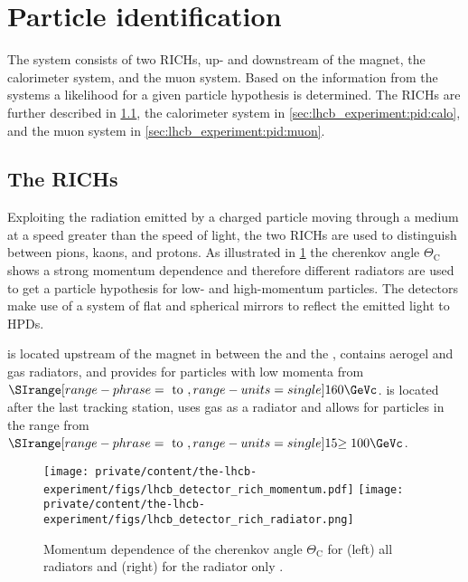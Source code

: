 \section{Particle identification}
\label{sec:lhcb_experiment:pid}

The \LHCb \PID system consists of two \acp{RICH}, up- and downstream of the
magnet, the calorimeter system, and the muon system. Based on the information
from the \PID systems a likelihood for a given particle hypothesis is
determined. The \acp{RICH} are further described in
\cref{sec:lhcb_experiment:pid:rich}, the calorimeter system in
\cref{sec:lhcb_experiment:pid:calo}, and the muon system in
\cref{sec:lhcb_experiment:pid:muon}.

\subsection{The \aclp*{RICH}}
\label{sec:lhcb_experiment:pid:rich}

Exploiting the radiation emitted by a charged particle moving through a medium
at a speed greater than the speed of light, the two \acp{RICH} are used to
distinguish between pions, kaons, and protons. As illustrated in
\cref{fig:lhcb_experiment:tracking:pid:radiator} the cherenkov angle
$\Theta_\mathrm{C}$ shows a strong momentum dependence and therefore different
radiators are used to get a particle hypothesis for low- and high-momentum
particles. The detectors make use of a system of flat and spherical mirrors to
reflect the emitted light to \acp{HPD}.

 is located upstream of the magnet in between the \VELO and the \TT,
contains aerogel and \fluorocarbonfour gas radiators, and provides \PID for
particles with low momenta from $\SIrange[range-phrase = \text{ to },range-units
= single]{1}{60}{\GeVc}$.  is located after the last tracking station,
uses \fluorocarbon gas as a radiator and allows \PID for particles in the range
from $\SIrange[range-phrase = \text{ to },range-units =
single]{15}{\geq100}{\GeVc}$.
%
\begin{figure}[t]
  \texttt{[image: private/content/the-lhcb-experiment/figs/lhcb\_detector\_rich\_momentum.pdf]}
  \texttt{[image: private/content/the-lhcb-experiment/figs/lhcb\_detector\_rich\_radiator.png]}
  \caption{Momentum dependence of the cherenkov angle $\Theta_\mathrm{C}$ for
  (left) all \RICH radiators \cite{Alves:2008zz} and (right) for the
  \fluorocarbonfour radiator only \cite{Adinolfi:2012qfa}.}
  \label{fig:lhcb_experiment:tracking:pid:radiator}
\end{figure}

